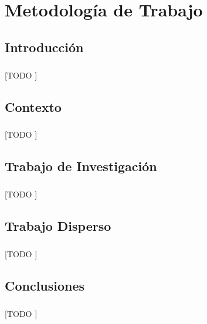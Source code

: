 \documentclass{subfiles}
\begin{document}
  \chapter{Metodología de Trabajo}
  \label{chap:methodology}

    \section{Introducción}
    \label{sec:methodology_intro}

      \paragraph{}
      [TODO ]

    \section{Contexto}
    \label{sec:methodology_contex}

      \paragraph{}
      [TODO ]

    \section{Trabajo de Investigación}
    \label{sec:methodology_research}

      \paragraph{}
      [TODO ]

    \section{Trabajo Disperso}
    \label{sec:methodology_sparse}

      \paragraph{}
      [TODO ]

    \section{Conclusiones}
    \label{sec:methodology_conclusions}

      \paragraph{}
      [TODO ]
      
\end{document}
